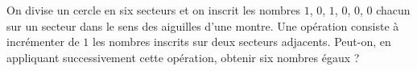 On divise un cercle en six secteurs et on inscrit les nombres $1$, $0$, $1$, $0$, $0$, $0$ chacun sur un secteur dans le sens des aiguilles d'une montre. Une opération consiste à incrémenter de $1$ les nombres inscrits sur deux secteurs adjacents. Peut-on, en appliquant successivement cette opération, obtenir six nombres égaux ?
